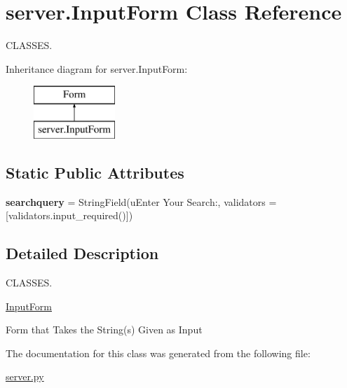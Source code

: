 \hypertarget{classserver_1_1_input_form}{}\section{server.\+Input\+Form Class Reference}
\label{classserver_1_1_input_form}


C\+L\+A\+S\+S\+ES.  


Inheritance diagram for server.\+Input\+Form\+:\begin{figure}[H]
\begin{center}
\leavevmode
\includegraphics[height=2.000000cm]{classserver_1_1_input_form}
\end{center}
\end{figure}
\subsection*{Static Public Attributes}
\begin{DoxyCompactItemize}
\item 
\mbox{\label{classserver_1_1_input_form_aeb69cc1418487bba68a254b916fca1f8}} 
{\bfseries searchquery} = String\+Field(u\textquotesingle{}Enter Your Search\+:\textquotesingle{}, validators = \mbox{[}validators.\+input\+\_\+required()\mbox{]})
\end{DoxyCompactItemize}


\subsection{Detailed Description}
C\+L\+A\+S\+S\+ES. 

\mbox{\hyperlink{classserver_1_1_input_form}{Input\+Form}}

Form that Takes the String(s) Given as Input 

The documentation for this class was generated from the following file\+:\begin{DoxyCompactItemize}
\item 
\mbox{\hyperlink{server_8py}{server.\+py}}\end{DoxyCompactItemize}
